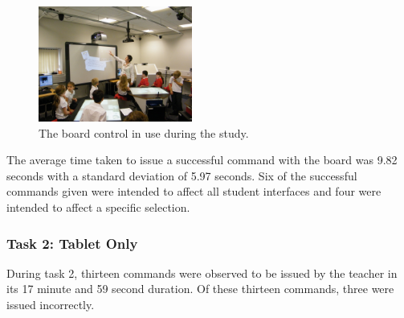 \documentclass[link]{IWCOMP}
\begin{document}
\begin{figure}[h]
   \centering
   \includegraphics[width=0.45\textwidth]{figures/new_study_board.png}
   \caption{The board control in use during the study.}
   \label{fig:studyBoard}
\end{figure}

The average time taken to issue a successful command with the board was 9.82 seconds with a standard deviation of 5.97 seconds.
Six of the successful commands given were intended to affect all student interfaces and four were intended to affect a specific selection.

\subsubsection{Task 2: Tablet Only}
\label{subsubsec:studyPhase2ResultsTask2}

During task 2, thirteen commands were observed to be issued by the teacher in its 17 minute and 59 second duration.
Of these thirteen commands, three were issued incorrectly.
\end{document}
